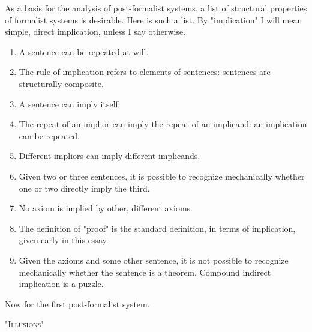 As a basis for the analysis of post-formalist systems, a list of structural 
properties of formalist systems is desirable. Here is such a list. By 
"implication" I will mean simple, direct implication, unless I say otherwise. 
\begin{enumerate}
\item A sentence can be repeated at will. 

\item The rule of implication refers to elements of sentences: sentences 
are structurally composite. 

\item A sentence can imply itself. 

\item The repeat of an implior can imply the repeat of an implicand: an 
implication can be repeated. 

\item Different impliors can imply different implicands. 

\item Given two or three sentences, it is possible to recognize 
mechanically whether one or two directly imply the third. 

\item No axiom is implied by other, different axioms. 

\item The definition of "proof" is the standard definition, in terms of 
implication, given early in this essay. 

\item Given the axioms and some other sentence, it is not possible to 
recognize mechanically whether the sentence is a theorem.
Compound indirect implication is a puzzle. 
\end{enumerate}

Now for the first post-formalist system. 

{ \centering \large "\textsc{Illusions}" \par}


